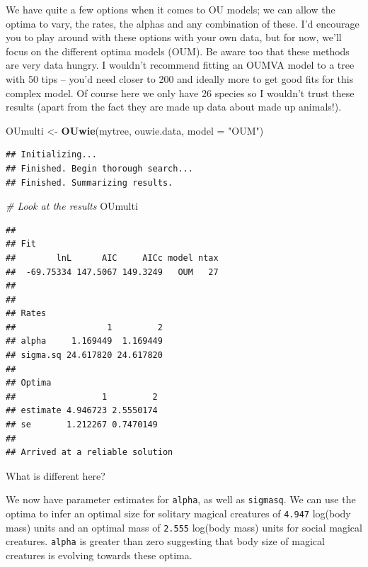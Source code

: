 \documentclass[]{book}
\newenvironment{Shaded}{\begin{snugshade}}{\end{snugshade}}
\newcommand{\KeywordTok}[1]{\textcolor[rgb]{0.13,0.29,0.53}{\textbf{{#1}}}}
\newcommand{\DataTypeTok}[1]{\textcolor[rgb]{0.13,0.29,0.53}{{#1}}}
\newcommand{\StringTok}[1]{\textcolor[rgb]{0.31,0.60,0.02}{{#1}}}
\newcommand{\CommentTok}[1]{\textcolor[rgb]{0.56,0.35,0.01}{\textit{{#1}}}}
\newcommand{\NormalTok}[1]{{#1}}
\begin{document}
We have quite a few options when it comes to OU models; we can allow the
optima to vary, the rates, the alphas and any combination of these. I'd
encourage you to play around with these options with your own data, but
for now, we'll focus on the different optima models (OUM). Be aware too
that these methods are very data hungry. I wouldn't recommend fitting an
OUMVA model to a tree with 50 tips -- you'd need closer to 200 and
ideally more to get good fits for this complex model. Of course here we
only have 26 species so I wouldn't trust these results (apart from the
fact they are made up data about made up animals!).

\begin{Shaded}
\begin{Highlighting}[]
\NormalTok{OUmulti <-}\StringTok{ }\KeywordTok{OUwie}\NormalTok{(mytree, ouwie.data, }\DataTypeTok{model =} \StringTok{"OUM"}\NormalTok{)}
\end{Highlighting}
\end{Shaded}

\begin{verbatim}
## Initializing... 
## Finished. Begin thorough search... 
## Finished. Summarizing results.
\end{verbatim}

\begin{Shaded}
\begin{Highlighting}[]
\CommentTok{# Look at the results}
\NormalTok{OUmulti}
\end{Highlighting}
\end{Shaded}

\begin{verbatim}
## 
## Fit
##        lnL      AIC     AICc model ntax
##  -69.75334 147.5067 149.3249   OUM   27
## 
## 
## Rates
##                  1         2
## alpha     1.169449  1.169449
## sigma.sq 24.617820 24.617820
## 
## Optima
##                 1         2
## estimate 4.946723 2.5550174
## se       1.212267 0.7470149
## 
## Arrived at a reliable solution
\end{verbatim}

What is different here?

We now have parameter estimates for \texttt{alpha}, as well as
\texttt{sigmasq}. We can use the optima to infer an optimal size for
solitary magical creatures of \texttt{4.947} log(body mass) units and an
optimal mass of \texttt{2.555} log(body mass) units for social magical
creatures. \texttt{alpha} is greater than zero suggesting that body size
of magical creatures is evolving towards these optima.
\end{document}
